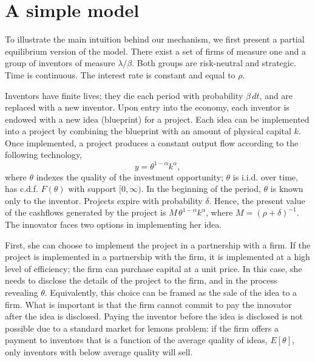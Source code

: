 \documentclass[12pt]{article}
\begin{document}
\section{A simple model}\label{sec:simple}


To illustrate the main intuition behind our mechanism, we first present a partial equilibrium version of the model. There exist a set of firms of measure one and a group of inventors of measure $\lambda/\beta$. Both groups are risk-neutral and strategic. Time is continuous. The interest rate is constant and equal to $\rho$.

Inventors have finite lives; they die each period with probability $\beta\,dt$, and are replaced with a new inventor.  Upon entry into the economy, each inventor is endowed with a  new idea (blueprint) for a project.
Each  idea  can be implemented into a project by combining the blueprint with an amount of physical capital $k$. Once implemented, a project produces a constant output flow according to the following technology,
\begin{equation}
y = \theta^{1-\alpha} k^\alpha,
\end{equation}
where $\theta$ indexes the quality of the investment opportunity; $\theta$ is i.i.d. over time,  has c.d.f. $F(\theta)$  with support $[0,\infty)$. In the beginning of the period, $\theta$ is known only to the inventor. Projects expire with probability $\delta$. Hence, the present value of the cashflows generated by the project is $M\, \theta^{1-\alpha} k^\alpha$, where $M=(\rho+\delta)^{-1}$.
The innovator faces two options in implementing her idea.

First, she can choose to implement the project in a  partnership with a firm. If the project is implemented in a partnership with the firm, it is implemented at a high level of efficiency; the firm can purchase capital at a unit price. In this case, she needs to disclose the details of the project to the firm, and in the process revealing $\theta$. Equivalently, this choice can be framed as the sale of the idea to a firm. What is important is that the firm cannot commit to pay the innovator after the idea is disclosed. Paying the inventor before the idea is disclosed is not possible due to a standard market for lemons problem: if the firm offers a payment to inventors that is a function of the average quality of ideas, $E[\theta]$, only inventors with below average quality will sell.
\end{document}
